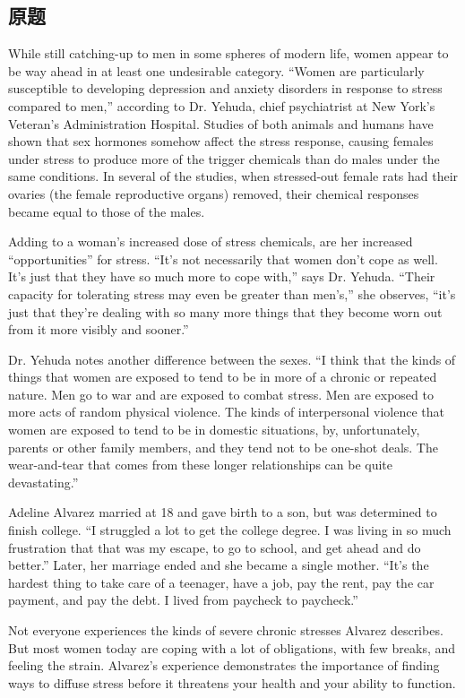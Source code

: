 \documentclass[a4paper]{ctexart}
\begin{document}
\subsection{原题}
While still catching-up to men in some spheres of modern life, women appear to be way ahead in at least one undesirable category. “Women are particularly susceptible to developing depression and anxiety disorders in response to stress compared to men,” according to Dr. Yehuda, chief psychiatrist at New York’s Veteran’s Administration Hospital.
Studies of both animals and humans have shown that sex hormones somehow affect the stress response, causing females under stress to produce more of the trigger chemicals than do males under the same conditions. In several of the studies, when stressed-out female rats had their ovaries (the female reproductive organs) removed, their chemical responses became equal to those of the males.
\par
Adding to a woman’s increased dose of stress chemicals, are her increased “opportunities” for stress. “It’s not necessarily that women don’t cope as well. It’s just that they have so much more to cope with,” says Dr. Yehuda. “Their capacity for tolerating stress may even be greater than men’s,” she observes, “it’s just that they’re dealing with so many more things that they become worn out from it more visibly and sooner.”
\par
Dr. Yehuda notes another difference between the sexes. “I think that the kinds of things that women are exposed to tend to be in more of a chronic or repeated nature. Men go to war and are exposed to combat stress. Men are exposed to more acts of random physical violence. The kinds of interpersonal violence that women are exposed to tend to be in domestic situations, by, unfortunately, parents or other family members, and they tend not to be one-shot deals. The wear-and-tear that comes from these longer relationships can be quite devastating.”
\par
Adeline Alvarez married at 18 and gave birth to a son, but was determined to finish college. “I struggled a lot to get the college degree. I was living in so much frustration that that was my escape, to go to school, and get ahead and do better.” Later, her marriage ended and she became a single mother. “It’s the hardest thing to take care of a teenager, have a job, pay the rent, pay the car payment, and pay the debt. I lived from paycheck to paycheck.”
\par
Not everyone experiences the kinds of severe chronic stresses Alvarez describes. But most women today are coping with a lot of obligations, with few breaks, and feeling the strain. Alvarez’s experience demonstrates the importance of finding ways to diffuse stress before it threatens your health and your ability to function.
\end{document}
